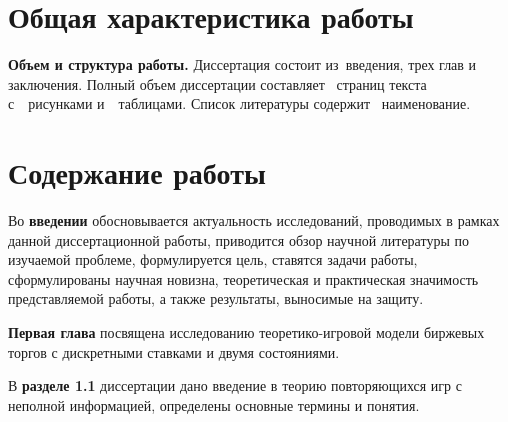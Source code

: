 
\section*{Общая характеристика работы}

\newcommand{\emphasis}[1]{\textbf{{#1}}}
\newcommand{\actuality}{\emphasis{\actualityTXT}}
\newcommand{\progress}{\emphasis{\progressTXT}}
\newcommand{\aim}{\emphasis{\aimTXT}}
\newcommand{\tasks}{\emphasis{\tasksTXT}}
\newcommand{\researchsubject}{\emphasis{\researchsubjectTXT}}
\newcommand{\novelty}{\emphasis{\noveltyTXT}}
\newcommand{\influence}{\emphasis{\influenceTXT}}
\newcommand{\methods}{\emphasis{\methodsTXT}}
\newcommand{\defpositions}{\emphasis{\defpositionsTXT}}
\newcommand{\reliability}{\emphasis{\reliabilityTXT}}
\newcommand{\probation}{\emphasis{\probationTXT}}
\newcommand{\contribution}{\emphasis{\contributionTXT}}
\newcommand{\publications}{\emphasis{\publicationsTXT}}



\emphasis{Объем и структура работы.}
Диссертация состоит из~введения, трех глав и заключения.
Полный объем диссертации составляет ~страниц текста с~~рисунками и~~таблицами.
Список литературы содержит ~наименование.

\section*{Содержание работы}
Во \emphasis{введении} обосновывается актуальность исследований, проводимых в рамках данной диссертационной работы, приводится обзор научной литературы по изучаемой проблеме, формулируется цель, ставятся задачи работы, сформулированы научная новизна, теоретическая и практическая значимость представляемой работы, а также результаты, выносимые на защиту.

\emphasis{Первая глава} посвящена исследованию теоретико-игровой модели биржевых торгов с дискретными ставками и двумя состояниями.

В \emphasis{разделе 1.1} диссертации дано введение в теорию повторяющихся игр с неполной информацией, определены основные термины и понятия.

